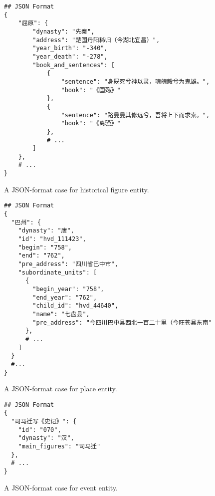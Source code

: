 \begin{figure}[ht]
\centering
\begin{adjustbox}{width=0.33\textwidth}
\begin{tcolorbox}[title={\textbf{\small Historical Figure}}, colback=whitesmoke, colframe=gray, boxrule=2pt, arc=0mm, width=0.5\textwidth]
{\small
\begin{verbatim}
## JSON Format
{
    "屈原": {
        "dynasty": "先秦",
        "address": "楚国丹阳秭归（今湖北宜昌）",
        "year_birth": "-340",
        "year_death": "-278",
        "book_and_sentences": [
            {
                "sentence": "身既死兮神以灵，魂魄毅兮为鬼雄。",
                "book": "《国殇》"
            },
            {
                "sentence": "路曼曼其修远兮，吾将上下而求索。",
                "book": "《离骚》"
            },
            # ...
        ]
    },
    # ...
}
\end{verbatim}
}
\end{tcolorbox}
\end{adjustbox}
\caption{A JSON-format case for historical figure entity.}
\label{fig:figure_case}
\end{figure}


\vspace{2cm}

\begin{figure}[H]
\centering
\begin{adjustbox}{width=0.33\textwidth}
\centering
\begin{tcolorbox}[title={\textbf{\small Place}}, colback=whitesmoke, colframe=gray, boxrule=2pt, arc=0mm]
{\small
\begin{verbatim}
## JSON Format
{
  "巴州": {
    "dynasty": "唐",
    "id": "hvd_111423",
    "begin": "758",
    "end": "762",
    "pre_address": "四川省巴中市",
    "subordinate_units": [
      {
        "begin_year": "758",
        "end_year": "762",
        "child_id": "hvd_44640",
        "name": "七盘县",
        "pre_address": "今四川巴中县西北一百二十里（今旺苍县东南"
      },
      # ...
    ]
  }
  #...
}
\end{verbatim}
}
\end{tcolorbox}
\end{adjustbox}
\caption{A JSON-format case for place entity.}
\label{fig:place_case}
\end{figure}



\begin{figure}[H]
\centering
\begin{adjustbox}{width=0.33\textwidth}
\begin{tcolorbox}[title={\textbf{\small Event}}, colback=whitesmoke, colframe=gray, boxrule=2pt, arc=0mm]
{\small
\begin{verbatim}
## JSON Format
{
  "司马迁写《史记》": {
    "id": "070",
    "dynasty": "汉",
    "main_figures": "司马迁"
  },
  # ...
}
\end{verbatim}
}
\end{tcolorbox}
\end{adjustbox}
\caption{A JSON-format case for event entity.}
\label{fig:event_case}
\end{figure}



